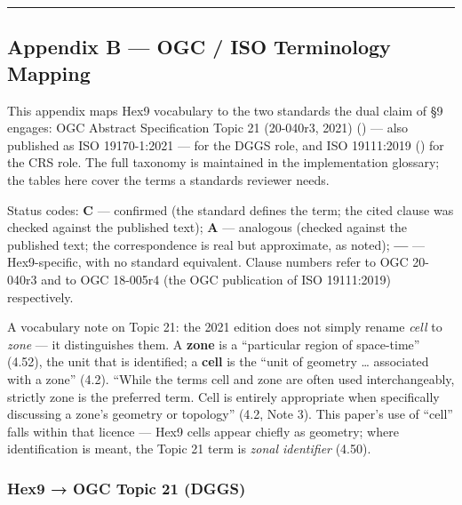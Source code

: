 \documentclass[
  11pt,
  a4paper,
]{article}
\begin{document}
\begin{center}\rule{0.5\linewidth}{0.5pt}\end{center}

\subsection{Appendix B --- OGC / ISO Terminology
Mapping}\label{appendix-b-ogc-iso-terminology-mapping}

This appendix maps Hex9 vocabulary to the two standards the dual claim
of §9 engages: OGC Abstract Specification Topic 21 (20-040r3, 2021)
() --- also
published as ISO 19170-1:2021 --- for the DGGS role, and ISO 19111:2019
() for the CRS role. The full taxonomy is maintained in the
implementation glossary; the tables here cover the terms a standards
reviewer needs.

Status codes: \textbf{C} --- confirmed (the standard defines the term;
the cited clause was checked against the published text); \textbf{A} ---
analogous (checked against the published text; the correspondence is
real but approximate, as noted); \textbf{---} --- Hex9-specific, with no
standard equivalent. Clause numbers refer to OGC 20-040r3 and to OGC
18-005r4 (the OGC publication of ISO 19111:2019) respectively.

A vocabulary note on Topic 21: the 2021 edition does not simply rename
\emph{cell} to \emph{zone} --- it distinguishes them. A \textbf{zone} is
a ``particular region of space-time'' (4.52), the unit that is
identified; a \textbf{cell} is the ``unit of geometry \ldots{}
associated with a zone'' (4.2). ``While the terms cell and zone are
often used interchangeably, strictly zone is the preferred term. Cell is
entirely appropriate when specifically discussing a zone's geometry or
topology'' (4.2, Note 3). This paper's use of ``cell'' falls within that
licence --- Hex9 cells appear chiefly as geometry; where identification
is meant, the Topic 21 term is \emph{zonal identifier} (4.50).

\subsubsection{Hex9 → OGC Topic 21 (DGGS)}\label{hex9-ogc-topic-21-dggs}
\end{document}
